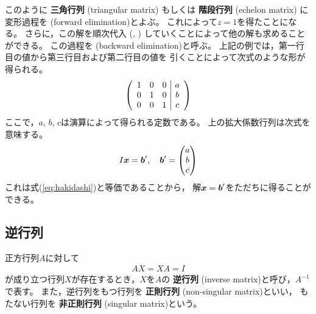\documentclass[twocolumn,11pt]{jarticle}
\begin{document}
このように
\textbf{三角行列}
(triangular matrix)
もしくは
\textbf{階段行列}
(echelon matrix)
に変形過程を
(forward elimination)とよぶ。
これによって$z=1$を得たことになる。
さらに，この解を順次代入
(, )
していくことによって他の解も求めることができる。
この過程を
(backward elimination)と呼ぶ。
上記の例では，第一行目の値から第三行目および第二行目の値を
引くことによって次式のような形が得られる。
\begin{align}
  \left(
  \begin{array}{ccc|c}
    1 & 0 & 0 & a\\
    0 & 1 & 0 & b\\
    0 & 0 & 1 & c
  \end{array}\right)\notag
\end{align}
ここで，$a$, $b$, $c$は演算によって得られる定数である。
上の拡大係数行列は次式を意味する。
\begin{align}
  I\boldsymbol{x}=\boldsymbol{b}', \quad \boldsymbol{b}'=
  \begin{pmatrix}
    a\\ b\\ c
  \end{pmatrix}\notag
\end{align}
これは式(\ref{eq:hakidashi})と等価であることから，
解$\boldsymbol{x}=\boldsymbol{b}'$をただちに得ることができる。%


\subsection{逆行列}
正方行列$A$に対して
\begin{align}
  AX=XA=I
\end{align}
が成り立つ行列$X$が存在するとき，$X$を$A$の
\textbf{逆行列}
(inverse matrix)と呼び，$A^{-1}$で表す。
また，逆行列をもつ行列を
\textbf{正則行列}
(non-singular matrix)といい，
もたない行列を
\textbf{非正則行列}
(singular matrix)という。
\end{document}

